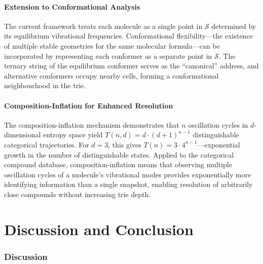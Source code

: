 \documentclass[11pt,twocolumn,a4paper]{article}
\theoremstyle{definition}
\theoremstyle{remark}
\newcommand{\Sspace}{\mathcal{S}}
\begin{document}
\subsection{Extension to Conformational Analysis}

The current framework treats each molecule as a single point in $\Sspace$ determined by its equilibrium vibrational frequencies. Conformational flexibility---the existence of multiple stable geometries for the same molecular formula---can be incorporated by representing each conformer as a separate point in $\Sspace$. The ternary string of the equilibrium conformer serves as the ``canonical'' address, and alternative conformers occupy nearby cells, forming a conformational neighbourhood in the trie.

\subsection{Composition-Inflation for Enhanced Resolution}

The composition-inflation mechanism \citep{sachikonye2025d} demonstrates that $n$ oscillation cycles in $d$-dimensional entropy space yield $T(n,d) = d \cdot (d+1)^{n-1}$ distinguishable categorical trajectories. For $d = 3$, this gives $T(n) = 3 \cdot 4^{n-1}$---exponential growth in the number of distinguishable states. Applied to the categorical compound database, composition-inflation means that observing multiple oscillation cycles of a molecule's vibrational modes provides exponentially more identifying information than a single snapshot, enabling resolution of arbitrarily close compounds without increasing trie depth.



\part{Discussion and Conclusion}

\section{Discussion}
\label{sec:discussion}
\end{document}

